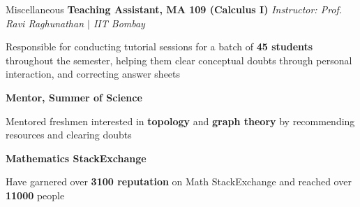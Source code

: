 \begin{rubric}{Miscellaneous}
    \entry*[2020] \textbf{Teaching Assistant, MA 109 (Calculus I)} \hfill \emph{Instructor: Prof. Ravi Raghunathan $\mid$ IIT Bombay}
	    
	    Responsible for conducting tutorial sessions for a batch of \textbf{45 students} throughout the semester, helping them clear conceptual doubts through personal interaction, and correcting answer sheets

	\entry*[2021, 2022] \textbf{Mentor, Summer of Science}

		Mentored freshmen interested in \textbf{topology} and \textbf{graph theory} by recommending resources and clearing doubts

	\entry* \textbf{Mathematics StackExchange}

		Have garnered over \textbf{3100 reputation} on Math StackExchange and reached over \textbf{11000} people
\end{rubric}
